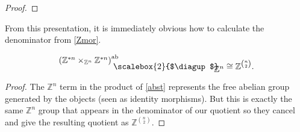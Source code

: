 \documentclass{amsbook} %
\newcommand{\bigquotient}[2]{ \raisebox{0.75\height}{$#1$} \mkern-12mu\scalebox{2}{$\diagup$}\mkern-10mu \raisebox{-0.5\height}{$#2$} }
\numberwithin{section}{chapter}
\begin{document}
\begin{proof}
\end{proof}


From this presentation, it is immediately obvious how to calculate the denominator from \cref{Zmor}.

\begin{cor} \label{nchoose2}
\[
\bigquotient{{(\mathbb{Z}^{\ast n} \times_{\mathbb{Z}^n} \mathbb{Z}^{\ast n})}^{\mathrm{ab}}}{\mathbb{Z}^n} \cong \mathbb{Z}^{{n}\choose{2}} . \]

\end{cor}
\begin{proof}
The $\mathbb{Z}^n$ term in the product of \cref{abst} represents the free abelian group generated by the objects (seen as identity morphisms).
But this is exactly the same $\mathbb{Z}^n$ group that appears in the denominator of our quotient so they cancel and give the resulting quotient as $\mathbb{Z}^{{n}\choose{2}}$.
\end{proof}
\end{document}

